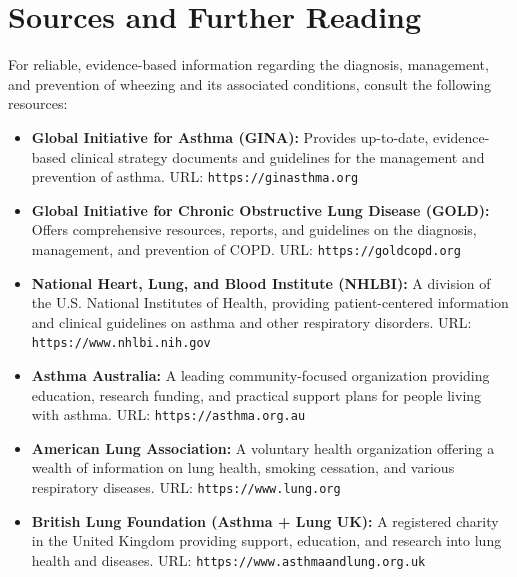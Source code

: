 \section*{Sources and Further Reading}
For reliable, evidence-based information regarding the diagnosis, management, and prevention of wheezing and its associated conditions, consult the following resources:
\begin{itemize}
    \item \textbf{Global Initiative for Asthma (GINA):} Provides up-to-date, evidence-based clinical strategy documents and guidelines for the management and prevention of asthma. URL: \texttt{https://ginasthma.org}
    \item \textbf{Global Initiative for Chronic Obstructive Lung Disease (GOLD):} Offers comprehensive resources, reports, and guidelines on the diagnosis, management, and prevention of COPD. URL: \texttt{https://goldcopd.org}
    \item \textbf{National Heart, Lung, and Blood Institute (NHLBI):} A division of the U.S. National Institutes of Health, providing patient-centered information and clinical guidelines on asthma and other respiratory disorders. URL: \texttt{https://www.nhlbi.nih.gov}
    \item \textbf{Asthma Australia:} A leading community-focused organization providing education, research funding, and practical support plans for people living with asthma. URL: \texttt{https://asthma.org.au}
    \item \textbf{American Lung Association:} A voluntary health organization offering a wealth of information on lung health, smoking cessation, and various respiratory diseases. URL: \texttt{https://www.lung.org}
    \item \textbf{British Lung Foundation (Asthma + Lung UK):} A registered charity in the United Kingdom providing support, education, and research into lung health and diseases. URL: \texttt{https://www.asthmaandlung.org.uk}
\end{itemize}
